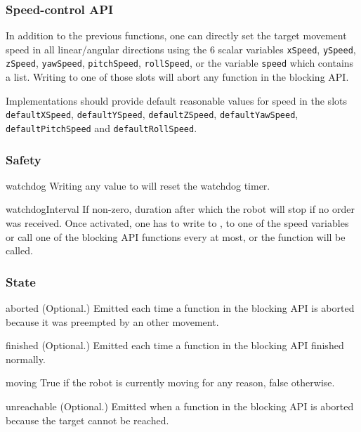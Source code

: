 \subsubsection{Speed-control API}

In addition to the previous functions, one can directly set the target
movement speed in all linear/angular directions using the 6 scalar variables
\lstinline{xSpeed}, \lstinline{ySpeed}, \lstinline{zSpeed},
\lstinline{yawSpeed}, \lstinline{pitchSpeed}, \lstinline{rollSpeed}, or the
variable \lstinline{speed} which contains a list.  Writing to one of those
slots will abort any function in the blocking API.

Implementations should provide default reasonable values for speed in the
slots \lstinline{defaultXSpeed}, \lstinline{defaultYSpeed},
\lstinline{defaultZSpeed}, \lstinline{defaultYawSpeed},
\lstinline{defaultPitchSpeed} and \lstinline{defaultRollSpeed}.

\subsubsection{Safety}

\begin{urbiscriptapi}
\item[watchdog] Writing any value to  will reset the
  watchdog timer.


\item[watchdogInterval] If non-zero, duration after which the robot will
  stop if no order was received. Once activated, one has to write to
  , to one of the speed variables or call one of the
  blocking API functions every  at most, or the
   function will be called.
\end{urbiscriptapi}

\subsubsection{State}

\begin{urbiscriptapi}
\item[aborted]{} (Optional.) Emitted each time a function in the blocking
  API is aborted because it was preempted by an other movement.


\item[finished]{} (Optional.) Emitted each time a function in the blocking
  API finished normally.


\item[moving] True if the robot is currently moving for any reason, false
  otherwise.


\item[unreachable]{} (Optional.) Emitted when a function in the blocking API
  is aborted because the target cannot be reached.
\end{urbiscriptapi}



